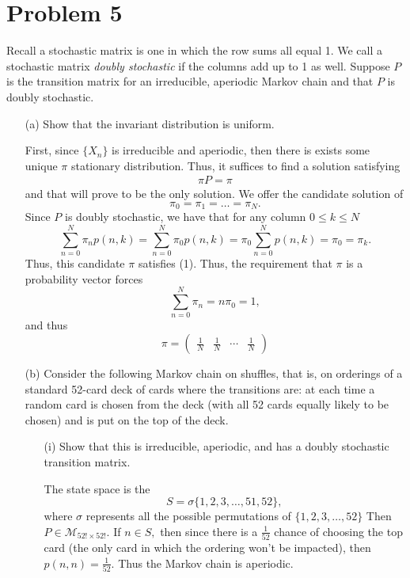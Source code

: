 \documentclass[11pt]{article}
\begin{document}
\newpage
\section*{Problem 5}
\begin{problem}
    
Recall a stochastic matrix is one in which the row sums all equal 1. We call a stochastic matrix \textit{doubly stochastic} if the columns add up to 1 as well. Suppose \( P \) is the transition matrix for an irreducible, aperiodic Markov chain and that \( P \) is doubly stochastic.
\end{problem}

\begin{enumerate}
    \item[(a)] Show that the invariant distribution is uniform.
\begin{solution}
    First, since $\{X_n\}$ is irreducible and aperiodic, then there is exists some unique $\pi$ stationary distribution. Thus, it suffices to find a solution satisfying 
    \begin{align}
        \pi P = \pi
    \end{align} and that will prove to be the only solution. We offer the candidate solution of 
    \[\pi_0 = \pi_1 = \dots = \pi_N.\]
    Since $P$ is doubly stochastic, we have that for any column $0\leq k\leq N$
\[\sum_{n=0}^N \pi_n p(n,k) = \sum_{n=0}^N \pi_0p(n,k)= \pi_0\sum_{n=0}^N p(n,k) = \pi_0 = \pi_k.\] Thus, this candidate $\pi$ satisfies (1). Thus, the requirement that $\pi$ is a probability vector forces 
\[\sum_{n=0}^N \pi_n = n\pi_0 = 1,\] and thus 
\[\pi = \begin{pmatrix}
    \frac{1}{N} & \frac{1}{N} & \cdots & \frac{1}{N}
\end{pmatrix}\]
\end{solution}
    \item[(b)] Consider the following Markov chain on shuffles, that is, on orderings of a standard 52-card deck of cards where the transitions are: at each time a random card is chosen from the deck (with all 52 cards equally likely to be chosen) and is put on the top of the deck.
    \begin{enumerate}
        \item[(i)] Show that this is irreducible, aperiodic, and has a doubly stochastic transition matrix.
    \begin{solution}
        The state space is the 
        \[S = \sigma\{1,2,3,\dots, 51,52\},\] where $\sigma$ represents all the possible permutations of $\{1,2,3,\dots, 52\}$ Then $P \in \mathcal{M}_{52! \times 52!}.$ If $n \in S,$ then since there is a $\frac{1}{52}$ chance of choosing the top card (the only card in which the ordering won't be impacted), then $p(n,n) = \frac{1}{52}.$ Thus the Markov chain is aperiodic. 

\end{solution}
\end{enumerate}
\end{enumerate}
\end{document}
